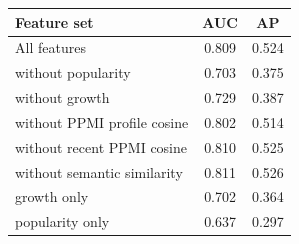 \begin{tabular}{lcc}
\toprule
Feature set & AUC & AP\\
\midrule
All features & 0.809 & 0.524\\
without popularity & 0.703 & 0.375\\
without growth & 0.729 & 0.387\\
without PPMI profile cosine & 0.802 & 0.514\\
without recent PPMI cosine & 0.810 & 0.525\\
without semantic similarity & 0.811 & 0.526\\
growth only & 0.702 & 0.364\\
popularity only & 0.637 & 0.297\\
\bottomrule
\end{tabular}